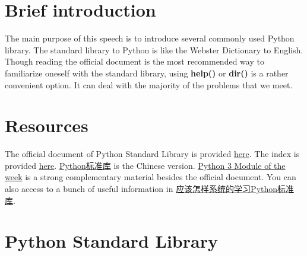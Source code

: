 \documentclass[english]{../TeXTemplate/pkupaper}
\title{\titlemark}
\author{Yifei Wang}
\date{\today}
\begin{document}
\raggedright

\maketitle
\tableofcontents
\section{Brief introduction}
The main purpose of this speech is to introduce several commonly used Python library. The standard library to Python is like the Webster Dictionary to English. Though reading the official document is the most recommended way to familiarize oneself with the standard library, using \textbf{help()} or \textbf{dir()} is a rather convenient option. It can deal with the majority of the problems that we meet. 

\section{Resources}
The official document of Python Standard Library is provided \href{https://docs.python.org/3.6/library/index.html}{here}. The index is provided \href{https://docs.python.org/3.6/py-modindex.html}{here}.  \href{http://python.usyiyi.cn/translate/python_352/library/index.html}{Python标准库} is the Chinese version. \href{https://pymotw.com/3/index.html}{Python 3 Module of the week} is a strong complementary material besides the official document. You can also access to a bunch of useful information in \href{https://www.zhihu.com/question/22100190}{应该怎样系统的学习Python标准库}.

\section{Python Standard Library}





\end{document}
